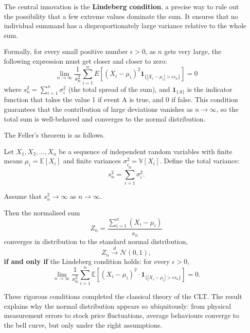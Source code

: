 The central innovation is the \textbf{Lindeberg condition}, a precise way to rule out the possibility that a few extreme values dominate the sum. It ensures that no individual summand has a disproportionately large variance relative to the whole sum.

Formally, for every small positive number $\epsilon > 0$, as $n$ gets very large, the following expression must get closer and closer to zero:
$$\lim_{n \to \infty} \frac{1}{s_n^2} \sum_{i=1}^{n} E[(X_i - \mu_i)^2 \mathbf{1}_{ \{|X_i - \mu_i| > \epsilon s_n \} }] = 0$$
where $s_n^2 = \sum_{i=1}^{n} \sigma_i^2$ (the total spread of the sum), and $\mathbf{1}_{ \{A \} }$ is the indicator function that takes the value 1 if event A is true, and 0 if false. 
This condition guarantees that the contribution of large deviations vanishes as \( n \to \infty \), so the total sum is well-behaved and converges to the normal distribution.


The Feller's theorem is as follows.

\begin{theorem}
Let \( X_1, X_2, \ldots, X_n \) be a sequence of independent random variables with finite means \( \mu_i = \mathbb{E}[X_i] \) and finite variances \( \sigma_i^2 = \mathbb{V}[X_i] \). Define the total variance:
\[
s_n^2 = \sum_{i=1}^n \sigma_i^2.
\]

Assume that \( s_n^2 \to \infty \) as \( n \to \infty \).

Then the normalised sum
\[
Z_n = \frac{\sum_{i=1}^{n} (X_i - \mu_i)}{s_n}
\]
converges in distribution to the standard normal distribution,
\[
Z_n \xrightarrow{d} \mathcal{N}(0,1),
\]
\textbf{if and only if} the Lindeberg condition holds: for every \( \epsilon > 0 \),
\[
\lim_{n \to \infty} \frac{1}{s_n^2} \sum_{i=1}^{n} \mathbb{E}\left[ (X_i - \mu_i)^2 \cdot \mathbf{1}_{\{|X_i - \mu_i| > \epsilon s_n\}} \right] = 0.
\]
\end{theorem}
These rigorous conditions completed the classical theory of the CLT. The result explains why the normal distribution appears so ubiquitously: from physical measurement errors to stock price fluctuations, average behaviours converge to the bell curve, but only under the right assumptions.


